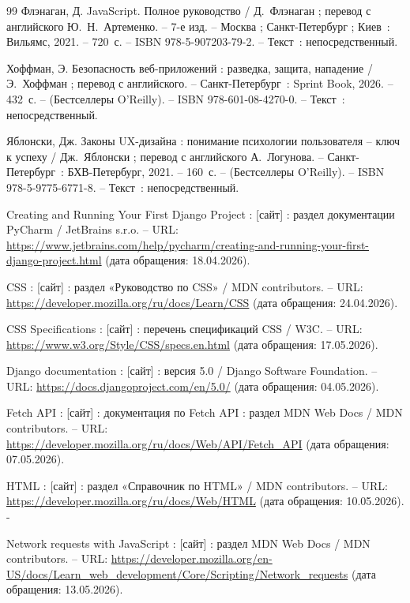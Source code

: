 \begin{thebibliography}{99}
     Флэнаган, Д. JavaScript. Полное руководство / Д.~Флэнаган ; перевод с английского Ю.~Н.~Артеменко. -- 7-е изд. -- Москва ; Санкт-Петербург ; Киев~: Вильямс, 2021. -- 720~с. -- ISBN 978-5-907203-79-2. -- Текст~: непосредственный.

     Хоффман, Э. Безопасность веб-приложений : разведка, защита, нападение / Э.~Хоффман ; перевод с английского. -- Санкт-Петербург~: Sprint Book, 2026. -- 432~с. -- (Бестселлеры O'Reilly). -- ISBN 978-601-08-4270-0. -- Текст~: непосредственный.

     Яблонски, Дж. Законы UX-дизайна : понимание психологии пользователя -- ключ к успеху / Дж.~Яблонски ; перевод с английского А.~Логунова. -- Санкт-Петербург~: БХВ-Петербург, 2021. -- 160~с. -- (Бестселлеры O'Reilly). -- ISBN 978-5-9775-6771-8. -- Текст~: непосредственный.

     Creating and Running Your First Django Project : [сайт] : раздел документации PyCharm / JetBrains s.r.o. -- URL: \url{https://www.jetbrains.com/help/pycharm/creating-and-running-your-first-django-project.html} (дата обращения: 18.04.2026). 

     CSS : [сайт] : раздел «Руководство по CSS» / MDN contributors. -- URL: \url{https://developer.mozilla.org/ru/docs/Learn/CSS} (дата обращения: 24.04.2026). 

     CSS Specifications : [сайт] : перечень спецификаций CSS / W3C. -- URL: \url{https://www.w3.org/Style/CSS/specs.en.html} (дата обращения: 17.05.2026). 

     Django documentation : [сайт] : версия 5.0 / Django Software Foundation. -- URL: \url{https://docs.djangoproject.com/en/5.0/} (дата обращения: 04.05.2026).

     Fetch API : [сайт] : документация по Fetch API : раздел MDN Web Docs / MDN contributors. -- URL: \url{https://developer.mozilla.org/ru/docs/Web/API/Fetch_API} (дата обращения: 07.05.2026).

     HTML : [сайт] : раздел «Справочник по HTML» / MDN contributors. -- URL: \url{https://developer.mozilla.org/ru/docs/Web/HTML} (дата обращения: 10.05.2026). -

     Network requests with JavaScript : [сайт] : раздел MDN Web Docs / MDN contributors. -- URL: \url{https://developer.mozilla.org/en-US/docs/Learn_web_development/Core/Scripting/Network_requests} (дата обращения: 13.05.2026). 


\end{thebibliography}
